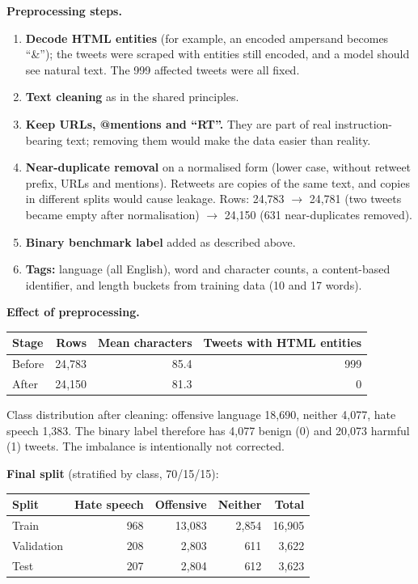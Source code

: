 \documentclass[11pt,a4paper]{article}
\newcommand{\hdr}[1]{\textbf{#1}}
\begin{document}
\smallskip
\textbf{Preprocessing steps.}
\begin{enumerate}
\item \textbf{Decode HTML entities} (for example, an encoded ampersand becomes ``\&''); the tweets were scraped with entities still encoded, and a model should see natural text. The 999 affected tweets were all fixed.
\item \textbf{Text cleaning} as in the shared principles.
\item \textbf{Keep URLs, @mentions and ``RT''.} They are part of real instruction-bearing text; removing them would make the data easier than reality.
\item \textbf{Near-duplicate removal} on a normalised form (lower case, without retweet prefix, URLs and mentions). Retweets are copies of the same text, and copies in different splits would cause leakage. Rows: 24{,}783 $\to$ 24{,}781 (two tweets became empty after normalisation) $\to$ 24{,}150 (631 near-duplicates removed).
\item \textbf{Binary benchmark label} added as described above.
\item \textbf{Tags:} language (all English), word and character counts, a content-based identifier, and length buckets from training data (10 and 17 words).
\end{enumerate}

\textbf{Effect of preprocessing.}\par\smallskip
\begin{tabularx}{\textwidth}{@{}l r r r@{}}
\toprule
\rowcolor{band}\hdr{Stage} & \hdr{Rows} & \hdr{Mean characters} & \hdr{Tweets with HTML entities}\\
\midrule
Before & 24{,}783 & 85.4 & 999\\
After & 24{,}150 & 81.3 & 0\\
\bottomrule
\end{tabularx}

\smallskip
Class distribution after cleaning: offensive language 18{,}690, neither 4{,}077, hate speech 1{,}383. The binary label therefore has 4{,}077 benign (0) and 20{,}073 harmful (1) tweets. The imbalance is intentionally not corrected.

\textbf{Final split} (stratified by class, 70/15/15):\par\smallskip
\begin{tabularx}{\textwidth}{@{}l r r r r@{}}
\toprule
\rowcolor{band}\hdr{Split} & \hdr{Hate speech} & \hdr{Offensive} & \hdr{Neither} & \hdr{Total}\\
\midrule
Train & 968 & 13{,}083 & 2{,}854 & 16{,}905\\
Validation & 208 & 2{,}803 & 611 & 3{,}622\\
Test & 207 & 2{,}804 & 612 & 3{,}623\\
\bottomrule
\end{tabularx}
\end{document}
